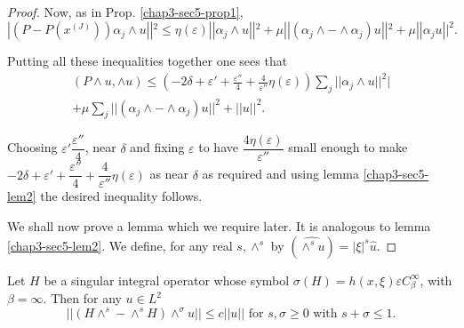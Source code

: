 \begin{proof}
Now, as in Prop. \ref{chap3-sec5-prop1},
$$
|(P- P(x^{(J)})) \alpha_j \wedge u||^2 \leq \eta (\varepsilon)||
\alpha_j \wedge u||^2 + \mu || (\alpha_j \wedge - \wedge \alpha_j )
u||^2 + \mu ||\alpha_j u||^2. 
$$\pageoriginale

Putting all these inequalities together one sees that 
\begin{gather*}
(P \wedge u, \wedge u) \leq \left(-2 \delta + \varepsilon' +
\frac{\varepsilon''}{4} + \frac{4}{\varepsilon''} \eta (\varepsilon)\right)
\sum\limits_j || \alpha_j \wedge u ||^2 |\\
 + \mu \sum\limits_j ||
(\alpha_j \wedge - \wedge \alpha_j) u||^2 + || u ||^2. 
\end{gather*}

Choosing $\varepsilon' \dfrac{\varepsilon''}{4}$, near $\delta$ and
fixing $\varepsilon$ to have $\dfrac{4 \eta (\varepsilon)}{\varepsilon
  ''}$ small enough to make $-2 \delta + 
\varepsilon' + \dfrac{\varepsilon''}{4}+ \dfrac{4}{\varepsilon''} \eta
(\varepsilon)$ as near $\delta$ as required and using lemma
\ref{chap3-sec5-lem2} the desired inequality follows. 

We shall now prove a lemma which we require later. It is analogous to
lemma \ref{chap3-sec5-lem2}. We define, for any real $s, \wedge^s $ by
$(\widehat{\wedge^s u}) = |\xi |^s \hat{u}$. 
\end{proof}

\begin{lemma}\label{chap3-sec5-lem3}%
Let $H$ be a singular integral operator whose symbol  
$\sigma (H)= h (x, \xi ) \varepsilon C^\infty_\beta$, with $\beta =
\infty$. Then for any $u \in L^2$ 
\begin{equation}
||(H \wedge^s - \wedge^s H) \wedge^\sigma u|| \leq c || u || \text{  for }
s, \sigma \geq 0 \text{ with } s + \sigma \leq
1. \tag{5.21} \label{chap3-eq5.21} 
\end{equation}
\end{lemma}

